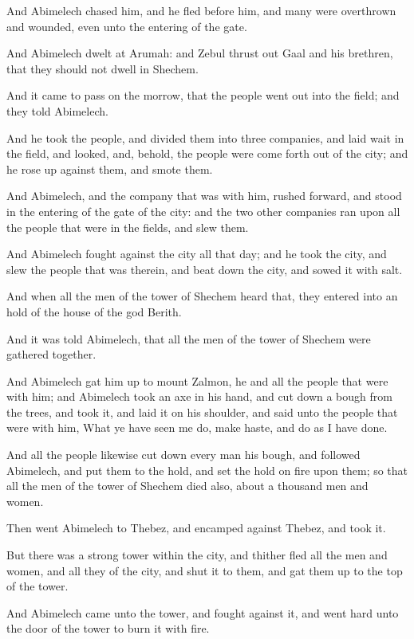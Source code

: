 \verse And Abimelech chased him, and he fled before him, and many were overthrown and wounded, even unto the entering of the gate.

\verse And Abimelech dwelt at Arumah: and Zebul thrust out Gaal and his brethren, that they should not dwell in Shechem.

\verse And it came to pass on the morrow, that the people went out into the field; and they told Abimelech.

\verse And he took the people, and divided them into three companies, and laid wait in the field, and looked, and, behold, the people were come forth out of the city; and he rose up against them, and smote them.

\verse And Abimelech, and the company that was with him, rushed forward, and stood in the entering of the gate of the city: and the two other companies ran upon all the people that were in the fields, and slew them.

\verse And Abimelech fought against the city all that day; and he took the city, and slew the people that was therein, and beat down the city, and sowed it with salt.

\verse And when all the men of the tower of Shechem heard that, they entered into an hold of the house of the god Berith.

\verse And it was told Abimelech, that all the men of the tower of Shechem were gathered together.

\verse And Abimelech gat him up to mount Zalmon, he and all the people that were with him; and Abimelech took an axe in his hand, and cut down a bough from the trees, and took it, and laid it on his shoulder, and said unto the people that were with him, What ye have seen me do, make haste, and do as I have done.

\verse And all the people likewise cut down every man his bough, and followed Abimelech, and put them to the hold, and set the hold on fire upon them; so that all the men of the tower of Shechem died also, about a thousand men and women.

\verse Then went Abimelech to Thebez, and encamped against Thebez, and took it.

\verse But there was a strong tower within the city, and thither fled all the men and women, and all they of the city, and shut it to them, and gat them up to the top of the tower.

\verse And Abimelech came unto the tower, and fought against it, and went hard unto the door of the tower to burn it with fire.

